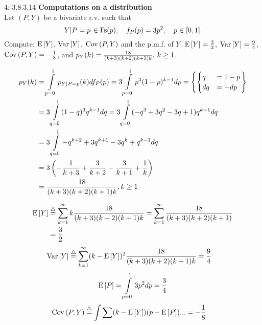 \documentclass[a4paper,twoside=false,abstract=false,numbers=noenddot,
titlepage=false,headings=small,parskip=half,version=last]{scrartcl}
\begin{document}

\begin{exercise}{4: 3.8.3.14} \textbf{Computations on a distribution} \\
    Let $(P,Y)$ be a bivariate r.v. such that
    \begin{equation}
        \left. Y \middle\vert P=p \right. \in \text{Fs}(p),\quad
        f_P(p)=3p^2,\quad
        p\in [0, 1].
    \end{equation}
    Compute: ${\rm E}\,[Y]$, ${\rm Var}\,[Y]$, ${\rm Cov}\,(P, Y)$ and the p.m.f.
    of $Y$.
    \Answer
    ${{\rm E}\,[Y]=\frac{3}{2}}$,
    ${{\rm Var}\,[Y]=\frac{9}{4}}$,
    ${{\rm Cov}\,(P,Y)=-\frac{1}{8}}$, and
    $p_{Y} (k) = \frac{18}{(k+3)(k+2)(k+1)k},\, k \ge 1$.

\end{exercise}
\begin{solution}

    \begin{align}
        p_{Y} (k) &= \int\limits_{p=0}^1 p_{Y|P=p} (k) df_P(p) =
        3\int\limits_{p=0}^1 p^3 (1-p)^{k-1}dp = \left\{
            \begin{cases}
                q   & = 1-p \\
                dq  & = -dp
            \end{cases}
        \right\} \nonumber \\ & =
        3\int\limits_{q=0}^1 (1-q)^3 q^{k-1} dq =
        3\int\limits_{q=0}^1 (-q^3+3 q^2-3 q+1) q^{k-1} dq \nonumber \\ & =
        3\int\limits_{q=0}^1 -q^{k+2}+3q^{k+1}-3q^k+q^{k-1} dq \nonumber \\ & =
        3\left(-\frac{1}{k+3}+\frac{3}{k+2}-\frac{3}{k+1}+\frac{1}{k}\right) \nonumber \\ & =
        \frac{18}{(k+3)(k+2)(k+1)k}, k \ge 1
    \end{align} %

    \begin{align}
        \Expected[Y] & \eqdef \sum\limits_{k=1}^\infty k
        \frac{18}{(k+3)(k+2)(k+1)k} =
        \sum\limits_{k=1}^\infty \frac{18}{(k+3)(k+2)(k+1)} \nonumber \\ & =
        \frac{3}{2}
    \end{align}
    \begin{align}
        \Variance[Y] & \eqdef \sum\limits_{k=1}^\infty (k - \Expected[Y])^2
        \frac{18}{(k+3)(k+2)(k+1)k} =
        \frac{9}{4}
    \end{align}
    \begin{equation}
        {\rm E}\,[P] = \int\limits_{p=0}^1 3p^2dp = \frac{3}{4}
    \end{equation}
    \begin{align}
        \CoVariance(P, Y) & \eqdef \int\sum
            (k - \Expected[Y])(p - \Expected[P])
        ... =
        -\frac{1}{8}
    \end{align}



\end{solution}
\pagebreak
\end{document}
